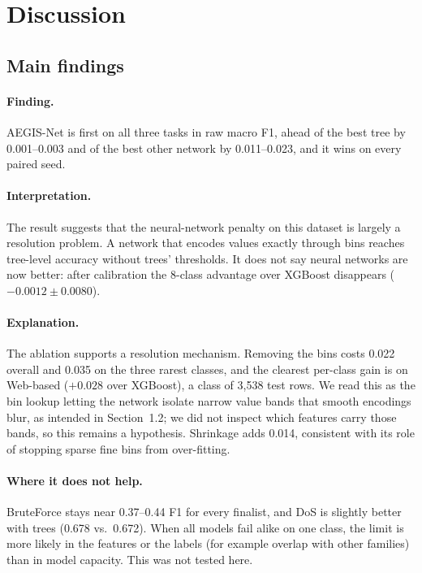 \documentclass[11pt,a4paper]{article}
\newcommand{\aegis}{AEGIS-Net}
\begin{document}
\section{Discussion}

\subsection{Main findings}\label{sec:findings}
\paragraph{Finding.} \aegis{} is first on all three tasks in raw macro F1, ahead of the best tree by 0.001--0.003 and of the best other network by 0.011--0.023, and it wins on every paired seed.

\paragraph{Interpretation.} The result suggests that the neural-network penalty on this dataset is largely a resolution problem. A network that encodes values exactly through bins reaches tree-level accuracy without trees' thresholds. It does not say neural networks are now better: after calibration the 8-class advantage over XGBoost disappears ($-0.0012\pm0.0080$).

\paragraph{Explanation.} The ablation supports a resolution mechanism. Removing the bins costs 0.022 overall and 0.035 on the three rarest classes, and the clearest per-class gain is on Web-based ($+0.028$ over XGBoost), a class of 3{,}538 test rows. We read this as the bin lookup letting the network isolate narrow value bands that smooth encodings blur, as intended in Section~1.2; we did not inspect which features carry those bands, so this remains a hypothesis. Shrinkage adds 0.014, consistent with its role of stopping sparse fine bins from over-fitting.

\paragraph{Where it does not help.} BruteForce stays near 0.37--0.44 F1 for every finalist, and DoS is slightly better with trees (0.678 vs.\ 0.672). When all models fail alike on one class, the limit is more likely in the features or the labels (for example overlap with other families) than in model capacity. This was not tested here.
\end{document}
